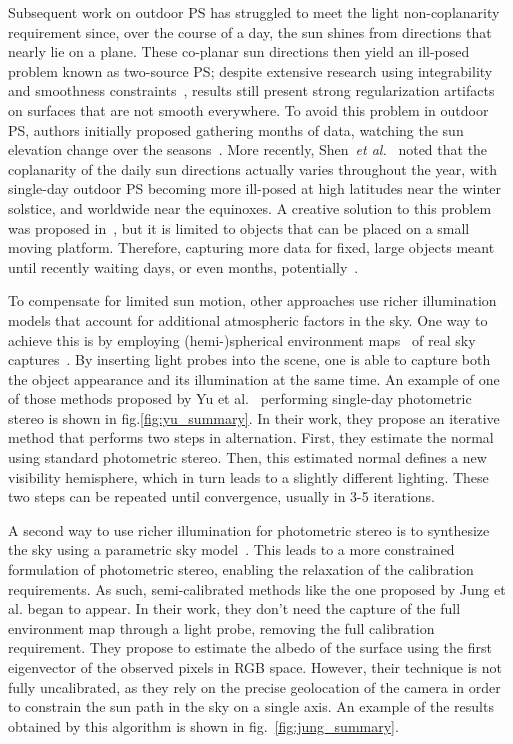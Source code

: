 Subsequent work on outdoor PS has struggled to meet the light non-coplanarity requirement since, over the course of a day, the sun shines from directions that nearly lie on a plane. These co-planar sun directions then yield an ill-posed problem known as two-source PS; despite extensive research using integrability and smoothness constraints~\cite{onn-ijcv-90,hernandez-pami-11}, results still present strong regularization artifacts on surfaces that are not smooth everywhere. To avoid this problem in outdoor PS, authors initially proposed gathering months of data, watching the sun elevation change over the seasons~\cite{abrams-eccv-12,ackermann-cvpr-12}. More recently, Shen~{\em et al.}~\cite{shen-pg-14} noted that the coplanarity of the daily sun directions actually varies throughout the year, with single-day outdoor PS becoming more ill-posed at high latitudes near the winter solstice, and worldwide near the equinoxes. A creative solution to this problem was proposed in~\cite{hung-wacv-15}, but it is limited to objects that can be placed on a small moving platform. Therefore, capturing more data for fixed, large objects meant until recently waiting days, or even months, potentially~\cite{ackermann-cvpr-12,abrams-eccv-12}. 


To compensate for limited sun motion, other approaches use richer illumination models that account for additional atmospheric factors in the sky. One way to achieve this is by employing \mbox{(hemi-)spherical} environment maps~\cite{debevec-siggraph-98} of real sky captures~\cite{yu-iccp-13,shi-3dv-14,hung-wacv-15}. By inserting light probes into the scene, one is able to capture both the object appearance and its illumination at the same time. An example of one of those methods proposed by Yu et al.~\cite{yu-iccp-13} performing single-day photometric stereo is shown in fig.\ref{fig:yu_summary}. In their work, they propose an iterative method that performs two steps in alternation. First, they estimate the normal using standard photometric stereo. Then, this estimated normal defines a new visibility hemisphere, which in turn leads to a slightly different lighting. These two steps can be repeated until convergence, usually in 3-5 iterations. 

A second way to use richer illumination for photometric stereo is to synthesize the sky using a parametric sky model~\cite{inose-tcva-13,jung-cvpr-15}. This leads to a more constrained formulation of photometric stereo, enabling the relaxation of the calibration requirements. As such, semi-calibrated methods like the one proposed by Jung et al.\cite{jung-cvpr-15} began to appear. In their work, they don't need the capture of the full environment map through a light probe, removing the full calibration requirement. They propose to estimate the albedo of the surface using the first eigenvector of the observed pixels in RGB space. However, their technique is not fully uncalibrated, as they rely on the precise geolocation of the camera in order to constrain the sun path in the sky on a single axis. An example of the results obtained by this algorithm is shown in fig.~\ref{fig:jung_summary}.


